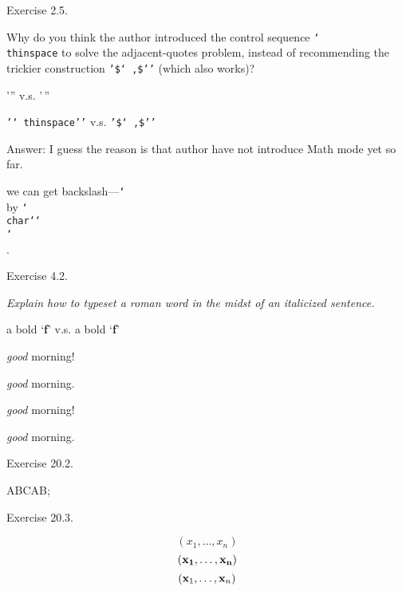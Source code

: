 
\beginsection Exercise 2.5.\par
Why do you think the author introduced the control sequence {\tt \char`\\thinspace} to
solve the adjacent-quotes problem, instead of recommending the trickier construction
{\tt '\$\char`\\,\$''} (which also works)?

'\thinspace'' v.s. '$\,$''

{\tt '\char`\\thinspace''} v.s. {\tt '\$\char`\\,\$''}

Answer: I guess the reason is that author have not introduce Math mode yet so far.

we can get backslash---{\tt \char`\\} by {\tt \char`\\char`\char`\\\char`\\}.

\beginsection Exercise 4.2.\par
{\it Explain how to typeset a {\rm roman} word in the midst of an italicized sentence.}\par
a bold `{\bf f\/}' v.s. a bold `{\bf f}'

\def\ic#1{{\it #1\/}}
\ic{good} morning!\par
{\it good} morning.\par
\rm
\ic{good} morning!\par
\rm
{\it good} morning.\par
\beginsection Exercise 20.2.\par
\def\a{\b}
\def\b{A\def\a{B\def\a{C\def\a{\b}}}}
\def\puzzle{\a\a\a\a\a}
\puzzle;

\beginsection Exercise 20.3.\par
\def\row#1{(#1_1,\ldots,#1_n)}
$$\row{x}$$
$$\row{\bf x}$$
$$\row{{\bf x}}$$

\bye %